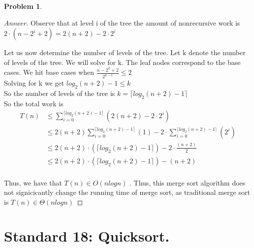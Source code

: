 \documentclass[11pt]{article}
\theoremstyle{definition}
\theoremstyle{definition}
\newtheorem{required}{Problem}
\theoremstyle{definition}
\begin{document}
\begin{required}
\begin{enumerate}[label=(\alph*)]
\begin{proof}[Answer]
Observe that at level i of the tree the amount of nonrecursive work is $2\cdot(n-2^i+2) = 2(n+2)-2\cdot2^i$

Let us now determine the number of levels of the tree. Let k denote the number of levels of the tree. We will solve for k. The leaf nodes correspond to the base cases. 
We hit base cases when $\frac{n-2^k+2}{2^{k-1}} \leq  2$ \\ 
Solving for k we get $log_2(n+2)-1 \leq k$ \\
So the number of levels of the tree is $k = \lceil log_2(n+2)-1 \rceil$ \\

So the total work is \\
\begin{align*}
T(n) &\leq \sum_{i=0}^{\lceil log_2(n+2)-1 \rceil}(2(n+2)-2\cdot2^i)\\
 &\leq 2(n+2) \sum_{i=0}^{\lceil log_2(n+2)-1 \rceil}(1) - 2 \cdot \sum_{i=0}^{\lceil log_2(n+2)-1 \rceil}(2^i) \\
 &\leq 2(n+2)\cdot(\lceil log_2(n+2)-1 \rceil )- 2 \cdot \frac{(n+2)}{2} \\
 &\leq 2(n+2)\cdot(\lceil log_2(n+2)-1 \rceil )- (n+2) \\
\end{align*}

Thus, we have that $T(n) \in O(nlogn)$
.
Thus, this merge sort algorithm does not signicicantly change the running time of merge sort, as traditional merge sort is $T(n) \in \Theta(nlogn)$ 
\end{proof}

\end{enumerate}
\end{required}


\newpage
\section{Standard 18: Quicksort.}
\end{document}
